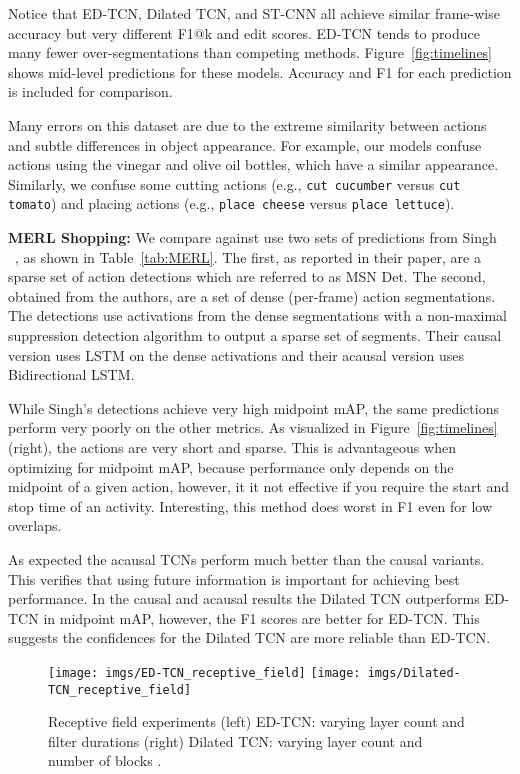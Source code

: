 \documentclass[10pt,twocolumn,letterpaper]{article}
\newcommand{\fakesubsection}[1]{\smallskip\noindent\textbf{#1:}}
\begin{document}
Notice that ED-TCN, Dilated TCN, and ST-CNN all achieve similar frame-wise accuracy but very different F1@k and edit scores. ED-TCN tends to produce many fewer over-segmentations than competing methods. Figure~\ref{fig:timelines} shows mid-level predictions for these models. Accuracy and F1 for each prediction is included for comparison.

Many errors on this dataset are due to the extreme similarity between actions and subtle differences in object appearance. For example, our models confuse actions using the vinegar and olive oil bottles, which have a similar appearance.
Similarly, we confuse some cutting actions (e.g., \texttt{cut cucumber} versus \texttt{cut tomato}) and placing actions (e.g., \texttt{place cheese} versus \texttt{place lettuce}).




\fakesubsection{MERL Shopping}
We compare against use two sets of predictions from Singh \etal~\cite{singh_cvpr_2016_merl}, as shown in Table~\ref{tab:MERL}. The first, as reported in their paper, are a sparse set of action detections which are referred to as MSN Det. The second, obtained from the authors, are a set of dense (per-frame) action segmentations. The detections use activations from the dense segmentations with a non-maximal suppression detection algorithm to output a sparse set of segments. Their causal version uses LSTM on the dense activations and their acausal version uses Bidirectional LSTM. 

While Singh's detections achieve very high midpoint mAP, the same predictions perform very poorly on the other metrics. As visualized in Figure~\ref{fig:timelines} (right), the actions are very short and sparse. This is advantageous when optimizing for midpoint mAP, because performance only depends on the midpoint of a given action, however, it it not effective if you require the start and stop time of an activity. 
Interesting, this method does worst in F1 even for low overlaps. 

As expected the acausal TCNs perform much better than the causal variants. This verifies that using future information is important for achieving best performance. In the causal and acausal results the Dilated TCN outperforms ED-TCN in midpoint mAP, however, the F1 scores are better for ED-TCN. This suggests the confidences for the Dilated TCN are more reliable than ED-TCN. 

\begin{figure}
	\center
	\texttt{[image: imgs/ED-TCN\_receptive\_field]} 
	\texttt{[image: imgs/Dilated-TCN\_receptive\_field]}
	\caption{Receptive field experiments (left) ED-TCN: varying layer count  and filter durations   (right) Dilated TCN: varying layer count  and  number of blocks .}
	\label{fig:receptive_field}
\end{figure}
\end{document}
